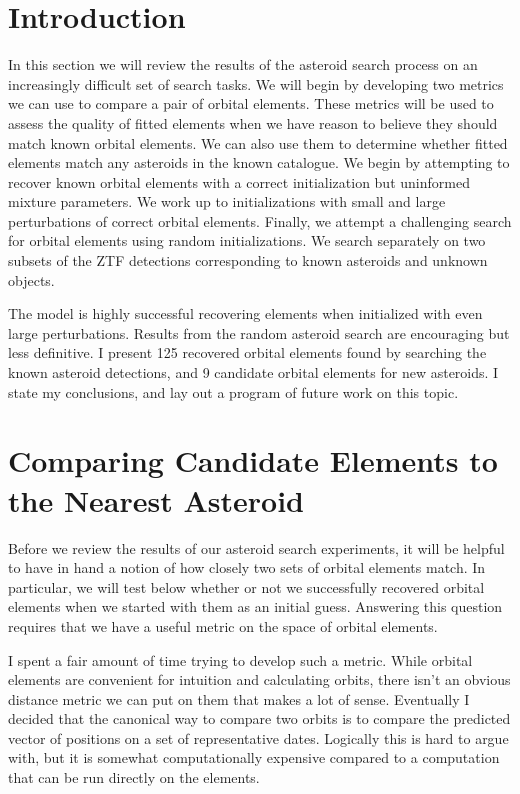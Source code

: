 \section{Introduction}
In this section we will review the results of the asteroid search process on an increasingly difficult set of search tasks.
We will begin by developing two metrics we can use to compare a pair of orbital elements.
These metrics will be used to assess the quality of fitted elements when we have 
reason to believe they should match known orbital elements.
We can also use them to determine whether fitted elements match any asteroids in the known catalogue.
We begin by attempting to recover known orbital elements with a correct initialization but uninformed mixture parameters.
We work up to initializations with small and large perturbations of correct orbital elements.
Finally, we attempt a challenging search for orbital elements using random initializations.
We search separately on two subsets of the ZTF detections corresponding to known asteroids and unknown objects.

The model is highly successful recovering elements when initialized with even large perturbations.
Results from the random asteroid search are encouraging but less definitive.
I present 125 recovered orbital elements found by searching the known asteroid detections,
and 9 candidate orbital elements for new asteroids.
I state my conclusions, and lay out a program of future work on this topic.

\section{Comparing Candidate Elements to the Nearest Asteroid}
Before we review the results of our asteroid search experiments, it will be helpful to have in hand a notion of how closely two sets of orbital elements match.
In particular, we will test below whether or not we successfully recovered orbital elements when we started with them as an initial guess.
Answering this question requires that we have a useful metric on the space of orbital elements.

I spent a fair amount of time trying to develop such a metric.
While orbital elements are convenient for intuition and calculating orbits, there isn't an obvious distance metric we can put on them that makes a lot of sense.
Eventually I decided that the canonical way to compare two orbits is to compare the predicted vector of positions on a set of representative dates.
Logically this is hard to argue with, but it is somewhat computationally expensive compared to a computation that can be run directly on the elements.

